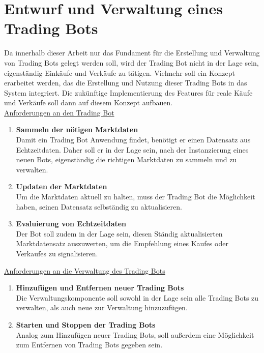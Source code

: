 \documentclass[oneside]{ausarbeitung}
\begin{document}

\section{Entwurf und Verwaltung eines Trading Bots}
\label{sec:trading_bot}

Da innerhalb dieser Arbeit nur das Fundament für die Erstellung und
Verwaltung von Trading Bots gelegt werden soll, wird der Trading Bot
nicht in der Lage sein, eigenständig Einkäufe und Verkäufe zu
tätigen. Vielmehr soll ein Konzept erarbeitet werden, das die
Erstellung und Nutzung dieser Trading Bots in das System integriert.
Die zukünftige Implementierung des Features für reale Käufe und
Verkäufe soll dann auf diesem Konzept aufbauen. \\

\underline{Anforderungen an den Trading Bot}
\begin{enumerate}
	\item \textbf{Sammeln der nötigen Marktdaten} \\
		Damit ein Trading Bot Anwendung findet, benötigt er einen Datensatz aus
		Echtzeitdaten. Daher soll er in der Lage sein, nach der Instanzierung
		eines neuen Bots, eigenständig die richtigen Marktdaten zu sammeln und zu
		verwalten.
	\item \textbf{Updaten der Marktdaten} \\
		Um die Marktdaten aktuell zu halten, muss der Trading Bot die Möglichkeit
		haben, seinen Datensatz selbständig zu aktualisieren.
	\item \textbf{Evaluierung von Echtzeitdaten} \\
		Der Bot soll zudem in der Lage sein, diesen Ständig aktualisierten
		Marktdatensatz auszuwerten, um die Empfehlung eines Kaufes oder Verkaufes
		zu signalisieren. \\
\end{enumerate}

\underline{Anforderungen an die Verwaltung des Trading Bots}
\begin{enumerate}
	\item \textbf{Hinzufügen und Entfernen neuer Trading Bots} \\
		Die Verwaltungskomponente soll sowohl in der Lage sein alle Trading Bots 
		zu verwalten, als auch neue zur Verwaltung hinzuzufügen.
	\item \textbf{Starten und Stoppen der Trading Bots} \\
		Analog zum Hinzufügen neuer Trading Bots, soll außerdem eine Möglichkeit 
		zum Entfernen von Trading Bots gegeben sein. \\
\end{enumerate}
\end{document}
